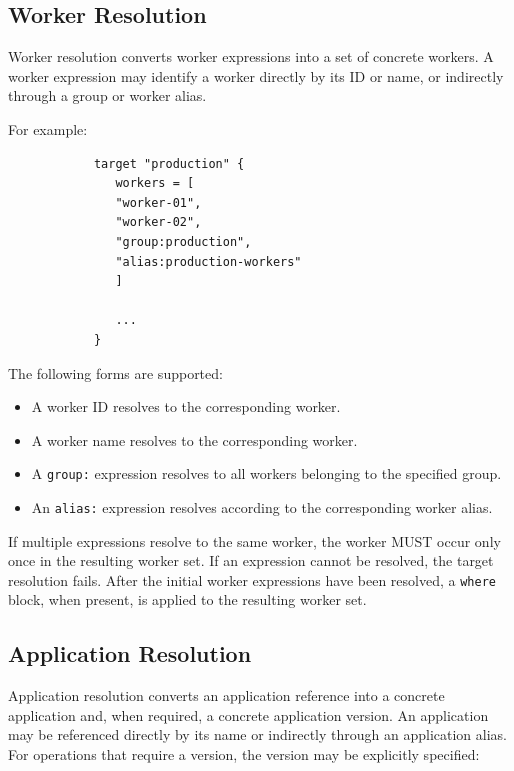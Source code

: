 \documentclass[11pt,a4paper]{article}
\begin{document}
    \subsection{Worker Resolution}\label{subsec:worker-resolution}

    Worker resolution converts worker expressions into a set of concrete workers.
    A worker expression may identify a worker directly by its ID or name, or indirectly through a group or worker alias.

    For example:

    \begin{center}
        \begin{verbatim}
            target "production" {
               workers = [
               "worker-01",
               "worker-02",
               "group:production",
               "alias:production-workers"
               ]

               ...
            }
        \end{verbatim}
    \end{center}

    The following forms are supported:

    \begin{itemize}
        \item A worker ID resolves to the corresponding worker.
        \item A worker name resolves to the corresponding worker.
        \item A \texttt{group:} expression resolves to all workers belonging to the specified group.
        \item An \texttt{alias:} expression resolves according to the corresponding worker alias.
    \end{itemize}

    If multiple expressions resolve to the same worker, the worker MUST occur only once in the resulting worker set.
    If an expression cannot be resolved, the target resolution fails.
    After the initial worker expressions have been resolved, a \texttt{where} block, when present, is applied to the resulting worker set.

    \subsection{Application Resolution}\label{subsec:application-resolution}

    Application resolution converts an application reference into a concrete application and, when required, a concrete application version.
    An application may be referenced directly by its name or indirectly through an application alias.
    For operations that require a version, the version may be explicitly specified:
\end{document}
